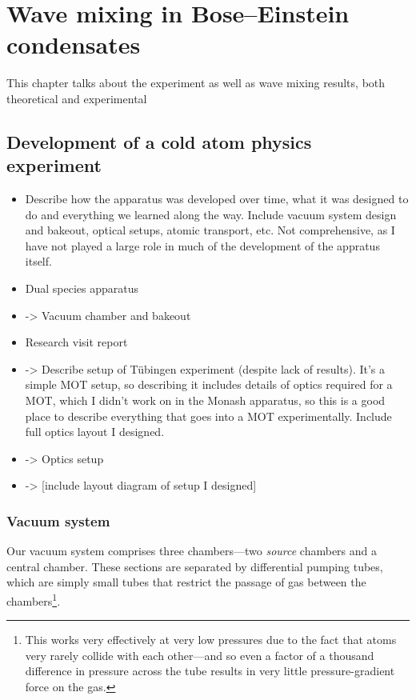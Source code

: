 \chapter{Wave mixing in Bose–Einstein condensates}\label{chap:wave_mixing}

This chapter talks about the experiment as well as wave mixing results, both theoretical and experimental

\section{Development of a cold atom physics experiment}\label{chap:experiment}
\begin{itemize}
\item Describe how the apparatus was developed over time, what it was designed to do and everything we learned along the way. Include vacuum system design and bakeout, optical setups, atomic transport, etc. Not comprehensive, as I have not played a large role in much of the development of the appratus itself.

\item Dual species apparatus
\item -> Vacuum chamber and bakeout
\item Research visit report
\item ->
    Describe setup of Tübingen experiment (despite lack of results). It's a simple MOT setup, so describing it includes details of optics required for a MOT, which I didn't work on in the Monash apparatus, so this is a good place to describe everything that goes into a MOT experimentally. Include full optics layout I designed.
    \item -> Optics setup
    \item -> [include layout diagram of setup I designed]
\end{itemize}

\subsection{Vacuum system}
Our vacuum system comprises three chambers---two \emph{source} chambers and a central chamber. These sections are separated by differential pumping tubes, which are simply small tubes that restrict the passage of gas between the chambers\footnote{This works very effectively at very low pressures due to the fact that atoms very rarely collide with each other---and so even a factor of a thousand difference in pressure across the tube results in very little pressure-gradient force on the gas.}.

